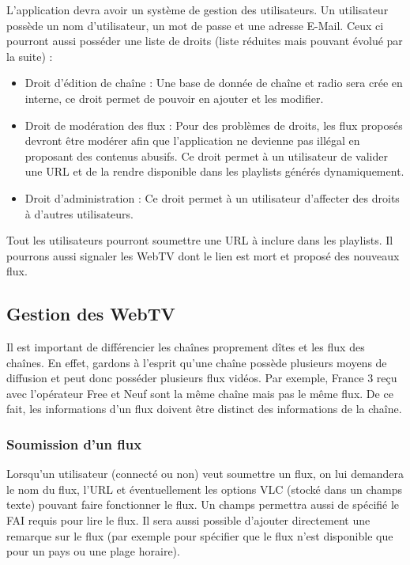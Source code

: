 \documentclass[10pt,a4paper]{article}
\begin{document}
L'application devra avoir un système de gestion des utilisateurs. Un utilisateur possède un nom d'utilisateur, un mot de passe et une adresse E-Mail.
Ceux ci pourront aussi posséder une liste de droits (liste réduites mais pouvant évolué par la suite) :

\begin{itemize}
\item Droit d'édition de chaîne : Une base de donnée de chaîne et radio sera crée en interne, ce droit permet de pouvoir en ajouter et les modifier.
\item Droit de modération des flux : Pour des problèmes de droits, les flux proposés devront être modérer afin que l'application ne devienne pas illégal en proposant des contenus abusifs. Ce droit permet à un utilisateur de valider une URL et de la rendre disponible dans les playlists générés dynamiquement.
\item Droit d'administration : Ce droit permet à un utilisateur d'affecter des droits à d'autres utilisateurs.
\end{itemize}

Tout les utilisateurs pourront soumettre une URL à inclure dans les playlists. Il pourrons aussi signaler les WebTV dont le lien est mort et proposé des nouveaux flux.

\subsection{Gestion des WebTV}

Il est important de différencier les chaînes proprement dîtes et les flux des chaînes. En effet, gardons à l'esprit qu'une chaîne possède plusieurs moyens de diffusion et peut donc posséder plusieurs flux vidéos. Par exemple, France 3 reçu avec l'opérateur Free et Neuf sont la même chaîne mais pas le même flux. De ce fait, les informations d'un flux doivent être distinct des informations de la chaîne.

\subsubsection{Soumission d'un flux}

Lorsqu'un utilisateur (connecté ou non) veut soumettre un flux, on lui demandera le nom du flux, l'URL et éventuellement les options VLC (stocké dans un champs texte) pouvant faire fonctionner le flux. Un champs permettra aussi de spécifié le FAI requis pour lire le flux. Il sera aussi possible d'ajouter directement une remarque sur le flux (par exemple pour spécifier que le flux n'est disponible que pour un pays ou une plage horaire).
\end{document}
